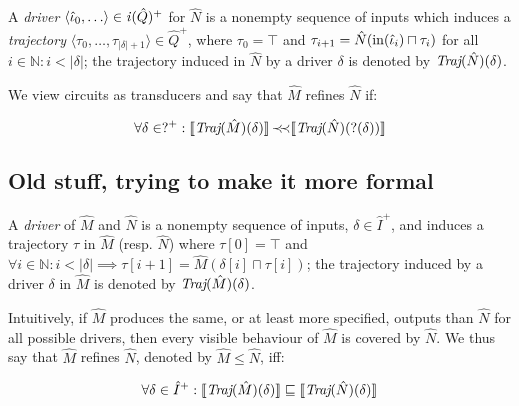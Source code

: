A \textit{driver} $\langle \hat \iota_{0}, \ldots \rangle \in \mathit{i}(\hat Q)^{+}$ for $\hat N$ is a nonempty sequence of inputs which induces a \textit{trajectory} $\langle \tau_{0}, \ldots, \tau_{| \delta | + 1} \rangle \in \hat Q^{+}$, where $\tau_{0} = \top$ and $\tau_{i+1} = \hat N(\operatorname{in}(\hat \iota_{i}) \sqcap \tau_{i})$ for all $i \in \mathbb{N} : i < | \delta |$; the trajectory induced in $\hat N$ by a driver $\delta$ is denoted by $\textit{Traj}(\hat N)(\delta)$.

We view circuits as transducers and say that $\hat M$ refines $\hat N$ if:

\begin{equation*}
\forall \delta \in ?^{+} : \llbracket\textit{Traj}(\hat M)(\delta)\rrbracket \operatorname{\prec\mkern-4mu\prec} \llbracket\textit{Traj}(\hat N)(?(\delta))\rrbracket
\end{equation*}


\subsection{Old stuff, trying to make it more formal}

A \textit{driver} of $\hat M$ and $\hat N$ is a nonempty sequence of inputs, $\delta \in \hat I^{+}$, and induces a trajectory $\tau$ in $\hat M$ (resp. $\hat N$) where $\tau[0] = \top$ and $\forall i \in \mathbb{N} : i < | \delta | \implies \tau[i+1] = \hat M(\delta[i] \sqcap \tau[i])$; the trajectory induced by a driver $\delta$ in $\hat M$ is denoted by $\textit{Traj}(\hat M)(\delta)$.

Intuitively, if $\hat M$ produces the same, or at least more specified, outputs than $\hat N$ for all possible drivers, then every visible behaviour of $\hat M$ is covered by $\hat N$. We thus say that $\hat M$ refines $\hat N$, denoted by $\hat M \leq \hat N$, iff:



\begin{equation*}
\forall \delta \in \hat I^{+} : \llbracket\textit{Traj}(\hat M)(\delta)\rrbracket \sqsubseteq \llbracket\textit{Traj}(\hat N)(\delta)\rrbracket
\end{equation*}


